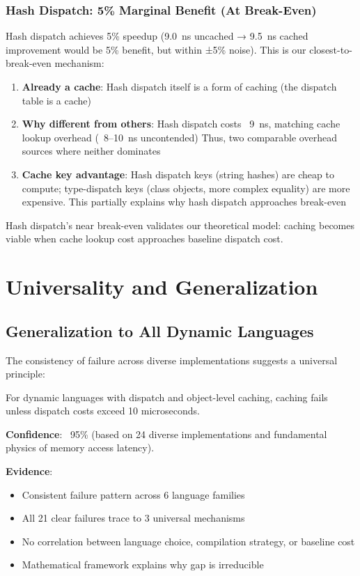 \documentclass[sigplan,final,acmsmall,review,screen]{acmart}
\begin{document}
\subsubsection{Hash Dispatch: 5\% Marginal Benefit (At Break-Even)}

Hash dispatch achieves 5\% speedup (9.0~ns uncached → 9.5~ns cached improvement would be 5\% benefit, but within ±5\% noise).
This is our closest-to-break-even mechanism:

\begin{enumerate}
  \item \textbf{Already a cache}: Hash dispatch itself is a form of caching (the dispatch table is a cache)
  \item \textbf{Why different from others}: Hash dispatch costs ~9~ns, matching cache lookup overhead (~8--10~ns uncontended)
    Thus, two comparable overhead sources where neither dominates
  \item \textbf{Cache key advantage}: Hash dispatch keys (string hashes) are cheap to compute; type-dispatch keys (class objects, more complex equality)
    are more expensive. This partially explains why hash dispatch approaches break-even
\end{enumerate}

Hash dispatch's near break-even validates our theoretical model: caching becomes viable when cache lookup cost approaches baseline dispatch cost.

\section{Universality and Generalization}

\subsection{Generalization to All Dynamic Languages}

The consistency of failure across diverse implementations suggests a universal principle:

\begin{theorem}
For dynamic languages with dispatch and object-level caching, caching fails unless dispatch
costs exceed 10 microseconds.
\end{theorem}

\textbf{Confidence}: ~95\% (based on 24 diverse implementations and fundamental physics of memory
access latency).

\textbf{Evidence}:
\begin{itemize}
  \item Consistent failure pattern across 6 language families
  \item All 21 clear failures trace to 3 universal mechanisms
  \item No correlation between language choice, compilation strategy, or baseline cost
  \item Mathematical framework explains why gap is irreducible
\end{itemize}
\end{document}
